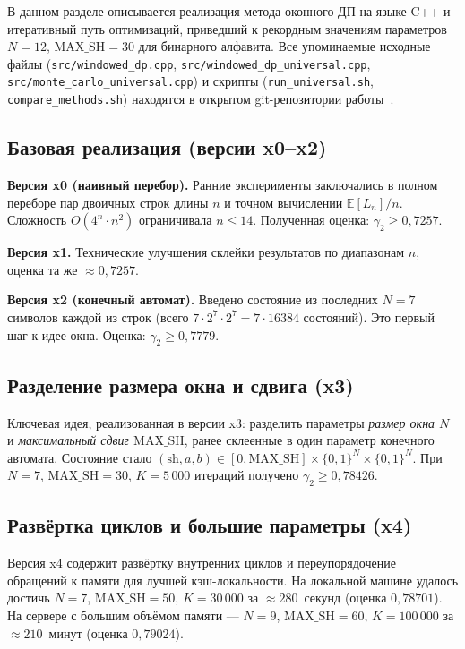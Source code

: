В данном разделе описывается реализация метода оконного ДП на языке C++ и итеративный путь оптимизаций, приведший к рекордным значениям параметров $N = 12$, $\mathrm{MAX\_SH} = 30$ для бинарного алфавита. Все упоминаемые исходные файлы (\texttt{src/windowed\_dp.cpp}, \texttt{src/windowed\_dp\_universal.cpp}, \texttt{src/monte\_carlo\_universal.cpp}) и скрипты (\texttt{run\_universal.sh}, \texttt{compare\_methods.sh}) находятся в открытом git-репозитории работы~\cite{ourgithub}.

\subsection{Базовая реализация (версии x0--x2)}

\textbf{Версия x0 (наивный перебор).} Ранние эксперименты заключались в полном переборе пар двоичных строк длины $n$ и точном вычислении $\mathbb{E}[L_n]/n$. Сложность $O(4^n \cdot n^2)$ ограничивала $n \leq 14$. Полученная оценка: $\gamma_2 \geq 0{,}7257$.

\textbf{Версия x1.} Технические улучшения склейки результатов по диапазонам $n$, оценка та же $\approx 0{,}7257$.

\textbf{Версия x2 (конечный автомат).} Введено состояние из последних $N = 7$ символов каждой из строк (всего $7 \cdot 2^7 \cdot 2^7 = 7 \cdot 16384$ состояний). Это первый шаг к идее окна. Оценка: $\gamma_2 \geq 0{,}7779$.

\subsection{Разделение размера окна и сдвига (x3)}

Ключевая идея, реализованная в версии x3: разделить параметры \emph{размер окна $N$} и \emph{максимальный сдвиг $\mathrm{MAX\_SH}$}, ранее склеенные в один параметр конечного автомата. Состояние стало $(\mathrm{sh}, a, b) \in [0, \mathrm{MAX\_SH}] \times \{0,1\}^N \times \{0,1\}^N$. При $N = 7$, $\mathrm{MAX\_SH} = 30$, $K = 5\,000$ итераций получено $\gamma_2 \geq 0{,}78426$.

\subsection{Развёртка циклов и большие параметры (x4)}

Версия x4 содержит развёртку внутренних циклов и переупорядочение обращений к памяти для лучшей кэш-локальности. На локальной машине удалось достичь $N = 7$, $\mathrm{MAX\_SH} = 50$, $K = 30\,000$ за $\approx 280$~секунд (оценка $0{,}78701$). На сервере с большим объёмом памяти --- $N = 9$, $\mathrm{MAX\_SH} = 60$, $K = 100\,000$ за $\approx 210$~минут (оценка $0{,}79024$).


